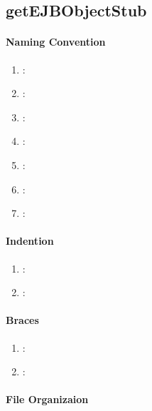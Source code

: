 \subsection{getEJBObjectStub} %
\label{sub:getEJBObjectStub}

\paragraph{Naming Convention} %
\label{par:naming_convention}

\begin{enumerate}
	\item \emph{\checkA}:
	\item \emph{\checkB}:
	\item \emph{\checkC}:
	\item \emph{\checkD}:
	\item \emph{\checkE}:
	\item \emph{\checkF}:
	\item \emph{\checkG}:
\end{enumerate}

\paragraph{Indention} %
\label{par:indention}

\begin{enumerate} [resume]
	\item \emph{\checkH}:
	\item \emph{\checkI}:
\end{enumerate}

\paragraph{Braces} %
\label{par:braces}

\begin{enumerate} [resume]
	\item \emph{\checkJ}:
	\item \emph{\checkK}:
\end{enumerate}

\paragraph{File Organizaion} %
\label{par:file_organizaion}

